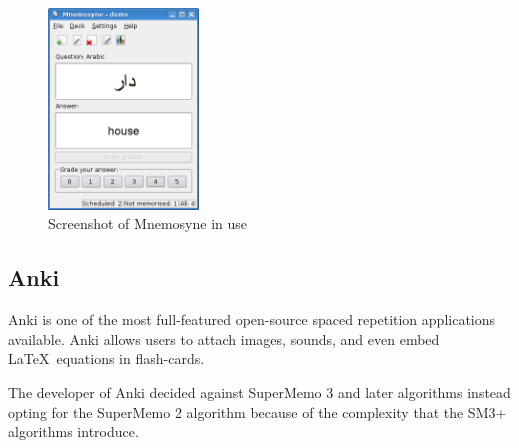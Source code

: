 \begin{figure}[h!]
\includegraphics[width=4cm]{img/mnemosyne_screen.png}
\caption{Screenshot of Mnemosyne in use}
\end{figure}

\subsection*{Anki}
Anki is one of the most full-featured open-source spaced repetition applications available.
Anki allows users to attach images, sounds, and even embed \LaTeX \ equations in flash-cards. 

The developer of Anki decided against SuperMemo 3 and later algorithms instead opting for
the SuperMemo 2 algorithm because of the complexity that the SM3+ algorithms introduce\cite{anki_faq}.
